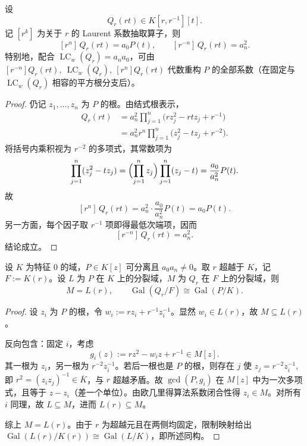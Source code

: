 \begin{theorem}[全息系数抽取与原多项式反演]\label{thm:group-jg-holographic-coefficient-recovery}
设
\[
Q_r(r t)\in K[r,r^{-1}][t].
\]
记 \([r^k]\) 为关于 \(r\) 的 Laurent 系数抽取算子，则
\[
[r^n]\,Q_r(r t)=a_0 P(t),\qquad
[r^{-n}]\,Q_r(r t)=a_n^2.
\]
特别地，配合 \(\operatorname{LC}_w(Q_r)=a_n a_0\)，可由
\(
[r^{-n}]Q_r(r t),\ \operatorname{LC}_w(Q_r),\ [r^n]Q_r(r t)
\)
代数重构 \(P\) 的全部系数（在固定与 \(\operatorname{LC}_w(Q_r)\) 相容的平方根分支后）。
\end{theorem}
\begin{proof}
仍记 \(z_1,\dots,z_n\) 为 \(P\) 的根。由结式根表示，
\[
\begin{aligned}
Q_r(r t)
&=a_n^2\prod_{j=1}^{n}\bigl(r z_j^2-r t z_j+r^{-1}\bigr)\\
&=a_n^2 r^n\prod_{j=1}^{n}\bigl(z_j^2-t z_j+r^{-2}\bigr).
\end{aligned}
\]
将括号内乘积视为 \(r^{-2}\) 的多项式，其常数项为
\[
\prod_{j=1}^{n}(z_j^2-t z_j)
=\Bigl(\prod_{j=1}^{n}z_j\Bigr)\prod_{j=1}^{n}(z_j-t)
=\frac{a_0}{a_n^2}P(t).
\]
故
\[
[r^n]\,Q_r(r t)=a_n^2\cdot \frac{a_0}{a_n^2}P(t)=a_0 P(t).
\]
另一方面，每个因子取 \(r^{-1}\) 项即得最低次端项，因而
\[
[r^{-n}]\,Q_r(r t)=a_n^2.
\]
结论成立。
\end{proof}

\begin{theorem}[超越尺度下的伽罗瓦全信息保持]\label{thm:group-jg-transcendental-galois-lossless}
设 \(K\) 为特征 \(0\) 的域，\(P\in K[z]\) 可分离且 \(a_0 a_n\neq 0\)。取 \(r\) 超越于 \(K\)，记 \(F:=K(r)\)。设 \(L\) 为 \(P\) 在 \(K\) 上的分裂域，\(M\) 为 \(Q_r\) 在 \(F\) 上的分裂域，则
\[
M=L(r),
\qquad
\operatorname{Gal}(Q_r/F)\cong \operatorname{Gal}(P/K).
\]
\end{theorem}
\begin{proof}
设 \(z_i\) 为 \(P\) 的根，令 \(w_i:=r z_i+r^{-1}z_i^{-1}\)。显然 \(w_i\in L(r)\)，故 \(M\subseteq L(r)\)。

反向包含：固定 \(i\)，考虑
\[
g_i(z):=r z^2-w_i z+r^{-1}\in M[z].
\]
其一根为 \(z_i\)，另一根为 \(r^{-2}z_i^{-1}\)。若后一根也是 \(P\) 的根，则存在 \(j\) 使
\(
z_j=r^{-2}z_i^{-1}
\),
即 \(r^2=(z_i z_j)^{-1}\in \overline{K}\)，与 \(r\) 超越矛盾。故 \(\gcd(P,g_i)\) 在 \(M[z]\) 中为一次多项式，且等于 \(z-z_i\)（差一个单位）。由欧几里得算法系数闭合性得 \(z_i\in M\)。对所有 \(i\) 同理，故 \(L\subseteq M\)，进而 \(L(r)\subseteq M\)。

综上 \(M=L(r)\)。由于 \(r\) 为超越元且在两侧均固定，限制映射给出
\(
\operatorname{Gal}(L(r)/K(r))\cong \operatorname{Gal}(L/K)
\)，即所述同构。
\end{proof}

